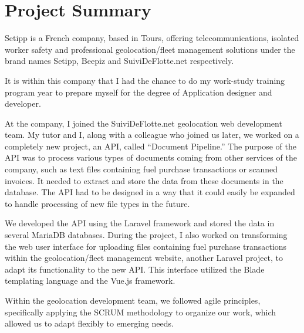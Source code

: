 \chapter{Project Summary}\label{ch:project-summary}


Setipp is a French company, based in Tours, offering telecommunications, isolated worker safety and professional geolocation/fleet management solutions under the brand names Setipp, Beepiz and SuiviDeFlotte.net respectively.

It is within this company that I had the chance to do my work-study training program year to prepare myself for the degree of Application designer and developer.

At the company, I joined the SuiviDeFlotte.net geolocation web development team. My tutor and I, along with a colleague who joined us later, we worked on a completely new project, an API, called ``Document Pipeline.'' The purpose of the API was to process various types of documents coming from other services of the company, such as text files containing fuel purchase transactions or scanned invoices. It needed to extract and store the data from these documents in the database. The API had to be designed in a way that it could easily be expanded to handle processing of new file types in the future.

We developed the API using the Laravel framework and stored the data in several MariaDB databases. During the project, I also worked on transforming the web user interface for uploading files containing fuel purchase transactions within the geolocation/fleet management website, another Laravel project, to adapt its functionality to the new API. This interface utilized the Blade templating language and the Vue.js framework.

Within the geolocation development team, we followed agile principles, specifically applying the SCRUM methodology to organize our work, which allowed us to adapt flexibly to emerging needs.